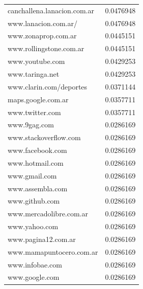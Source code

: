 \begin{table}
\begin{center}
{\begin{tabular}{ l | c }
canchallena.lanacion.com.ar & 0.0476948 \\
www.lanacion.com.ar/ & 0.0476948 \\
www.zonaprop.com.ar & 0.0445151 \\
www.rollingstone.com.ar & 0.0445151 \\
www.youtube.com & 0.0429253 \\
www.taringa.net & 0.0429253 \\
www.clarin.com/deportes & 0.0371144 \\
maps.google.com.ar & 0.0357711 \\
www.twitter.com & 0.0357711 \\
www.9gag.com & 0.0286169 \\
www.stackoverflow.com & 0.0286169 \\
www.facebook.com & 0.0286169 \\
www.hotmail.com & 0.0286169 \\
www.gmail.com & 0.0286169 \\
www.assembla.com & 0.0286169 \\
www.github.com & 0.0286169 \\
www.mercadolibre.com.ar & 0.0286169 \\
www.yahoo.com & 0.0286169 \\
www.pagina12.com.ar & 0.0286169 \\
www.mamapuntocero.com.ar & 0.0286169 \\
www.infobae.com & 0.0286169 \\
www.google.com & 0.0286169 \\
\hline
\end{tabular}
}
\\ 
\vspace{0.5cm}
\end{center}
\end{table}
